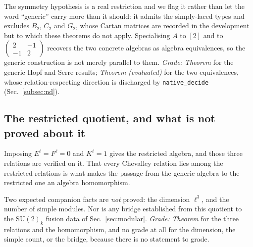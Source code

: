\documentclass[aps,prx,nofootinbib,superscriptaddress,12pt]{revtex4-2}
\begin{document}
The symmetry hypothesis is a real restriction and we flag it rather than
let the word ``generic'' carry more than it should: it admits the
simply-laced types and excludes $B_2$, $C_2$ and $G_2$, whose Cartan
matrices are recorded in the development but to which these theorems do
not apply. Specialising $A$ to $[2]$ and to
$\left(\begin{smallmatrix}2 & -1\\ -1 & 2\end{smallmatrix}\right)$
recovers the two concrete algebras as algebra equivalences, so the
generic construction is not merely parallel to them. \emph{Grade:
Theorem} for the generic Hopf and Serre results; \emph{Theorem
(evaluated)} for the two equivalences, whose relation-respecting
direction is discharged by \texttt{native\_decide}
(Sec.~\ref{subsec:nd}).

\subsection{The restricted quotient, and what is not proved about it}

Imposing $E^{\ell} = F^{\ell} = 0$ and $K^{\ell} = 1$ gives the
restricted algebra, and those three relations are verified on it. That
every Chevalley relation lies among the restricted relations is what
makes the passage from the generic algebra to the restricted one an
algebra homomorphism.

Two expected companion facts are \emph{not} proved: the dimension
$\ell^{3}$, and the number of simple modules. Nor is any bridge
established from this quotient to the $\mathrm{SU}(2)_k$ fusion data of
Sec.~\ref{sec:modular}. \emph{Grade: Theorem} for the three relations
and the homomorphism, and no grade at all for the dimension, the simple
count, or the bridge, because there is no statement to grade.



\end{document}
